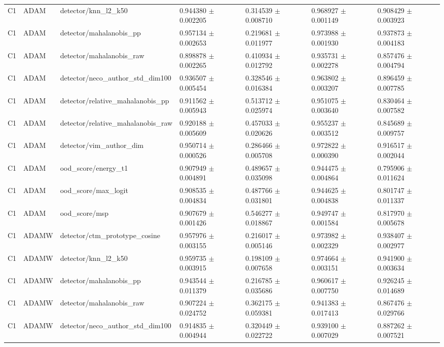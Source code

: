 \begin{longtable}{lllllll}
C1 & ADAM & detector/knn\_l2\_k50 & 0.944380 $\pm$ 0.002205 & 0.314539 $\pm$ 0.008710 & 0.968927 $\pm$ 0.001149 & 0.908429 $\pm$ 0.003923 \\
C1 & ADAM & detector/mahalanobis\_pp & 0.957134 $\pm$ 0.002653 & 0.219681 $\pm$ 0.011977 & 0.973988 $\pm$ 0.001930 & 0.937873 $\pm$ 0.004183 \\
C1 & ADAM & detector/mahalanobis\_raw & 0.898878 $\pm$ 0.002265 & 0.410934 $\pm$ 0.012792 & 0.935731 $\pm$ 0.002278 & 0.857476 $\pm$ 0.004794 \\
C1 & ADAM & detector/neco\_author\_std\_dim100 & 0.936507 $\pm$ 0.005454 & 0.328546 $\pm$ 0.016384 & 0.963802 $\pm$ 0.003207 & 0.896459 $\pm$ 0.007785 \\
C1 & ADAM & detector/relative\_mahalanobis\_pp & 0.911562 $\pm$ 0.005943 & 0.513712 $\pm$ 0.025974 & 0.951075 $\pm$ 0.003640 & 0.830464 $\pm$ 0.007582 \\
C1 & ADAM & detector/relative\_mahalanobis\_raw & 0.920188 $\pm$ 0.005609 & 0.457033 $\pm$ 0.020626 & 0.955237 $\pm$ 0.003512 & 0.845689 $\pm$ 0.009757 \\
C1 & ADAM & detector/vim\_author\_dim & 0.950714 $\pm$ 0.000526 & 0.286466 $\pm$ 0.005708 & 0.972822 $\pm$ 0.000390 & 0.916517 $\pm$ 0.002044 \\
C1 & ADAM & ood\_score/energy\_t1 & 0.907949 $\pm$ 0.004891 & 0.489657 $\pm$ 0.035098 & 0.944475 $\pm$ 0.004864 & 0.795906 $\pm$ 0.011624 \\
C1 & ADAM & ood\_score/max\_logit & 0.908535 $\pm$ 0.004834 & 0.487766 $\pm$ 0.031801 & 0.944625 $\pm$ 0.004838 & 0.801747 $\pm$ 0.011337 \\
C1 & ADAM & ood\_score/msp & 0.907679 $\pm$ 0.001426 & 0.546277 $\pm$ 0.018867 & 0.949747 $\pm$ 0.001584 & 0.817970 $\pm$ 0.005678 \\
C1 & ADAMW & detector/ctm\_prototype\_cosine & 0.957976 $\pm$ 0.003155 & 0.216017 $\pm$ 0.005146 & 0.973982 $\pm$ 0.002329 & 0.938407 $\pm$ 0.002977 \\
C1 & ADAMW & detector/knn\_l2\_k50 & 0.959735 $\pm$ 0.003915 & 0.198109 $\pm$ 0.007658 & 0.974664 $\pm$ 0.003151 & 0.941900 $\pm$ 0.003634 \\
C1 & ADAMW & detector/mahalanobis\_pp & 0.943544 $\pm$ 0.011379 & 0.216785 $\pm$ 0.035686 & 0.960617 $\pm$ 0.007750 & 0.926245 $\pm$ 0.014689 \\
C1 & ADAMW & detector/mahalanobis\_raw & 0.907224 $\pm$ 0.024752 & 0.362175 $\pm$ 0.059381 & 0.941383 $\pm$ 0.017413 & 0.867476 $\pm$ 0.029766 \\
C1 & ADAMW & detector/neco\_author\_std\_dim100 & 0.914835 $\pm$ 0.004944 & 0.320449 $\pm$ 0.022722 & 0.939100 $\pm$ 0.007029 & 0.887262 $\pm$ 0.007521 \\

\end{longtable}
